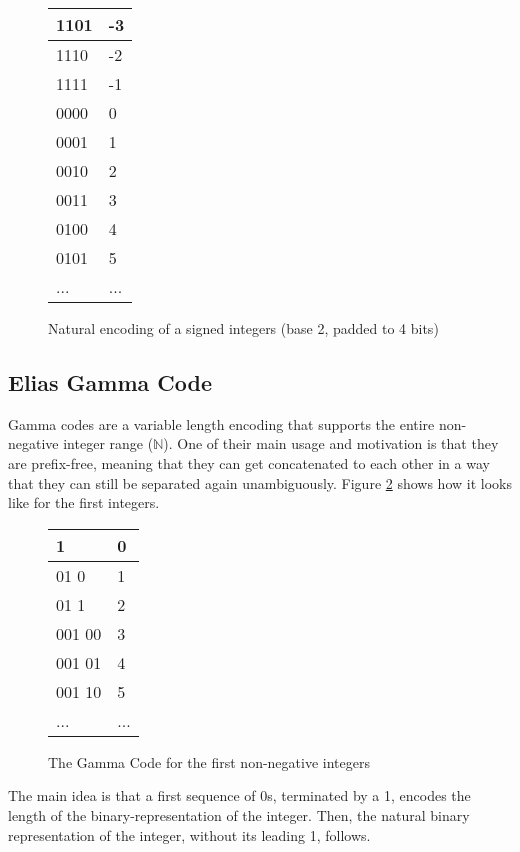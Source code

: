 \documentclass{acm_proc_article-sp}
\begin{document}
\begin{figure}
\caption{Natural encoding of a signed integers (base 2, padded to 4 bits)}
\label{figure-natural-encoding-padded}
\center
\begin{tabular}{|l|l|}
\hline
1101 & -3 \\
\hline
1110 & -2 \\
\hline
1111 & -1 \\
\hline
0000 & 0 \\
\hline
0001 & 1 \\
\hline
0010 & 2 \\
\hline
0011 & 3 \\
\hline
0100 & 4 \\
\hline
0101 & 5 \\
\hline
... & ... \\
\hline
\end{tabular}
\end{figure}

\subsection{Elias Gamma Code}

Gamma codes are a variable length encoding that supports the entire non-negative integer range ($\mathbb{N}$). One of their main usage and motivation is that they are prefix-free, meaning that they can get concatenated to each other in a way that they can still be separated again unambiguously. Figure \ref{figure-gamma-encoding} shows how it looks like for the first integers.

\begin{figure}
\caption{The Gamma Code for the first non-negative integers}
\label{figure-gamma-encoding}
\center
\begin{tabular}{|l|l|}
\hline
1 & 0 \\
\hline
01 0 & 1 \\
\hline
01 1 & 2 \\
\hline
001 00 & 3 \\
\hline
001 01 & 4 \\
\hline
001 10 & 5 \\
\hline
... & ... \\
\hline
\end{tabular}
\end{figure}

 The main idea is that a first sequence of 0s, terminated by a 1, encodes the length of the binary-representation of the integer. Then, the natural binary representation of the integer, without its leading 1, follows.
\end{document}
